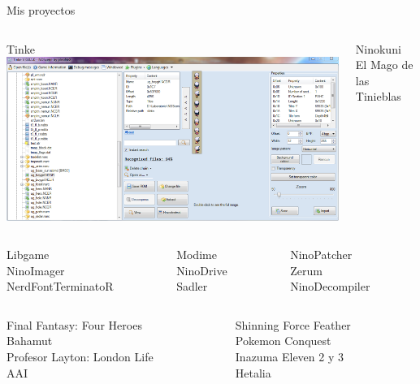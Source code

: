 \begin{frame}{Mis proyectos}
    \setlength{\leftmargini}{0em}
    \begin{columns}
    \begin{column}{0.4\textwidth}
        \Large Tinke
        \includegraphics[width=\textwidth]{tinke_preview.png}
    \end{column}
    \begin{column}{0.6\textwidth}
        \Large Ninokuni \\ El Mago de las Tinieblas
    \end{column}
    \end{columns}

    \vfill
    \small
    \begin{columns}
    \begin{column}{0.3\textwidth}
        Libgame \\
        NinoImager \\
        NerdFontTerminatoR
    \end{column}
    \begin{column}{0.3\textwidth}
        Modime \\
        NinoDrive \\
        Sadler
    \end{column}
    \begin{column}{0.3\textwidth}
        NinoPatcher \\
        Zerum \\
        NinoDecompiler
    \end{column}
    \end{columns}

    \vfill
    \begin{columns}
    \begin{column}{0.5\textwidth}
        Final Fantasy: Four Heroes \\
        Bahamut \\
        Profesor Layton: London Life \\
        AAI
    \end{column}
    \begin{column}{0.5\textwidth}
        Shinning Force Feather \\
        Pokemon Conquest \\
        Inazuma Eleven 2 y 3 \\
        Hetalia
    \end{column}
    \end{columns}
\end{frame}
